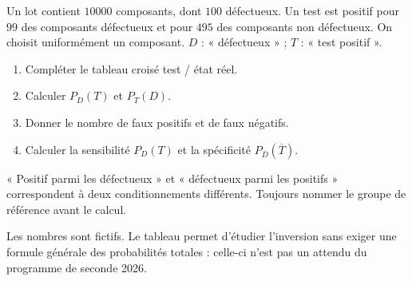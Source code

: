 \begin{example}Un lot contient $10000$ composants, dont $100$ défectueux. Un test est positif pour $99$ des composants défectueux et pour $495$ des composants non défectueux. On choisit uniformément un composant. $D$ : « défectueux » ; $T$ : « test positif ».
\begin{enumerate}\item Compléter le tableau croisé test / état réel.\item Calculer $P_D(T)$ et $P_T(D)$.\item Donner le nombre de faux positifs et de faux négatifs.\item Calculer la sensibilité $P_D(T)$ et la spécificité $P_{\overline D}(\overline T)$.\end{enumerate}\end{example}
\begin{keypoint}
« Positif parmi les défectueux » et « défectueux parmi les positifs » correspondent à deux conditionnements différents. Toujours nommer le groupe de référence avant le calcul.
\end{keypoint}
\begin{teachernote}Les nombres sont fictifs. Le tableau permet d'étudier l'inversion sans exiger une formule générale des probabilités totales : celle-ci n'est pas un attendu du programme de seconde 2026.\end{teachernote}

